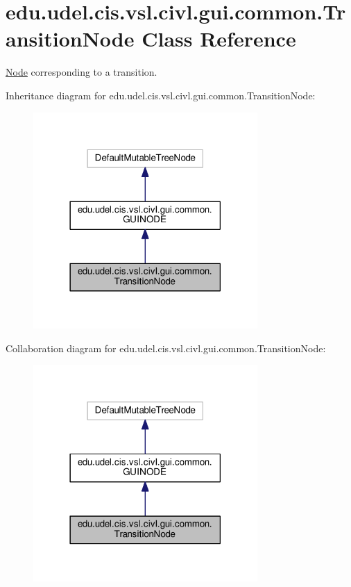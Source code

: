 \hypertarget{classedu_1_1udel_1_1cis_1_1vsl_1_1civl_1_1gui_1_1common_1_1TransitionNode}{}\section{edu.\+udel.\+cis.\+vsl.\+civl.\+gui.\+common.\+Transition\+Node Class Reference}
\label{classedu_1_1udel_1_1cis_1_1vsl_1_1civl_1_1gui_1_1common_1_1TransitionNode}


\hyperlink{structNode}{Node} corresponding to a transition.  




Inheritance diagram for edu.\+udel.\+cis.\+vsl.\+civl.\+gui.\+common.\+Transition\+Node\+:
\nopagebreak
\begin{figure}[H]
\begin{center}
\leavevmode
\includegraphics[width=242pt]{classedu_1_1udel_1_1cis_1_1vsl_1_1civl_1_1gui_1_1common_1_1TransitionNode__inherit__graph}
\end{center}
\end{figure}


Collaboration diagram for edu.\+udel.\+cis.\+vsl.\+civl.\+gui.\+common.\+Transition\+Node\+:
\nopagebreak
\begin{figure}[H]
\begin{center}
\leavevmode
\includegraphics[width=242pt]{classedu_1_1udel_1_1cis_1_1vsl_1_1civl_1_1gui_1_1common_1_1TransitionNode__coll__graph}
\end{center}
\end{figure}
